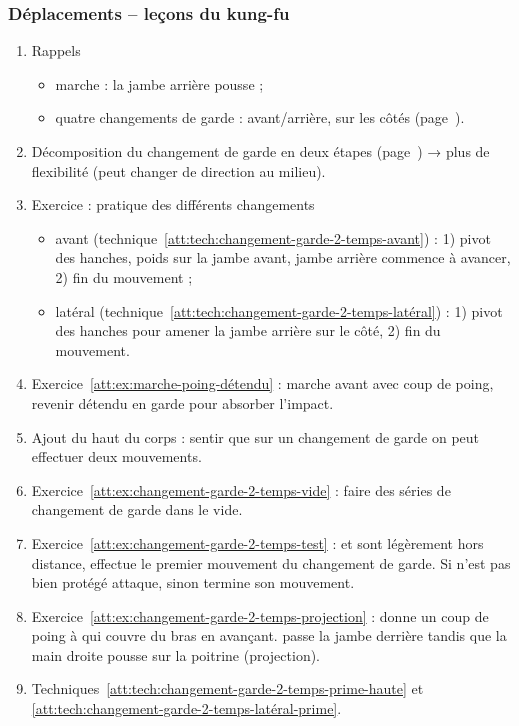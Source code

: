\subsubsection{Déplacements -- leçons du kung-fu}




\begin{enumerate}
	\item Rappels
	\begin{itemize}
		\item marche : la jambe arrière pousse ;
		\item quatre changements de garde : avant/arrière, sur les côtés (page~\pageref{dep:def:changement-garde-avant}).
	\end{itemize}
	
	\item Décomposition du changement de garde en deux étapes (page~\pageref{def:texte:garde-kung-fu}) → plus de flexibilité (peut changer de direction au milieu).
	
	\item Exercice : pratique des différents changements
	\begin{itemize}
		\item avant (technique~\ref{att:tech:changement-garde-2-temps-avant}) : 1) pivot des hanches, poids sur la jambe avant, jambe arrière commence à avancer, 2) fin du mouvement ;
		\item latéral (technique~\ref{att:tech:changement-garde-2-temps-latéral}) : 1) pivot des hanches pour amener la jambe arrière sur le côté, 2) fin du mouvement.
	\end{itemize}
	
	\item Exercice~\ref{att:ex:marche-poing-détendu} : marche avant avec coup de poing, revenir détendu en garde pour absorber l'impact.
	
	\item Ajout du haut du corps : sentir que sur un changement de garde on peut effectuer deux mouvements.
	
	\item Exercice~\ref{att:ex:changement-garde-2-temps-vide} : faire des séries de changement de garde dans le vide.
	
	\item Exercice~\ref{att:ex:changement-garde-2-temps-test} : \A et \D sont légèrement hors distance, \A effectue le premier mouvement du changement de garde.
	Si \A n'est pas bien protégé \D attaque, sinon \A termine son mouvement.
	
	\item Exercice~\ref{att:ex:changement-garde-2-temps-projection} : \A donne un coup de poing à \D qui couvre du bras en avançant.
	\D passe la jambe derrière \D tandis que la main droite pousse sur la poitrine (projection).
	
	\item Techniques~\ref{att:tech:changement-garde-2-temps-prime-haute} et \ref{att:tech:changement-garde-2-temps-latéral-prime}.
\end{enumerate}

